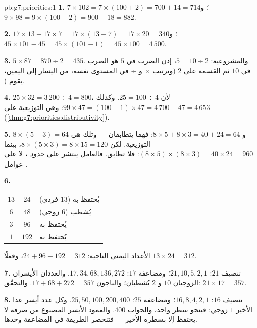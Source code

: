 \begin{solution}{pb:g7:priorities:1}
\textbf{1.} $7 \times 102 = 7 \times (100 + 2) = 700 + 14 =
714$؛ \quad و $9 \times 98 = 9 \times (100 - 2) = 900 - 18 = 882$.

\textbf{2.} $17 \times 13 + 17 \times 7 = 17 \times (13 + 7) =
17 \times 20 = 340$؛ \quad و $45 \times 101 - 45 = 45 \times (101
- 1) = 45 \times 100 = 4\,500$.

\textbf{3.} $5 \times 87 = 870 \div 2 = 435$. والمشروعية:
$5 = 10 \div 2$، إذن الضرب في $5$ هو الضرب في $10$
ثم القسمة على $2$ (وترتيب $\times$ و $\div$ في
المستوى نفسه، من اليسار إلى اليمين، يقوم ).

\textbf{4.} $25 \times 32 = 3\,200 \div 4 = 800$، لأن
$25 = 100 \div 4$. وكذلك
$99 \times 47 = (100 - 1) \times 47 = 4\,700 - 47 = 4\,653$:
وهي التوزيعية على 
(\cref{thm:g7:priorities:distributivity}).

\textbf{5.} $8 \times (5 + 3) = 64$ و $8 \times 5 + 8 \times 3
= 40 + 24 = 64$: فهما يتطابقان --- وتلك هي التوزيعية. لكن
$8 \times (5 \times 3) = 8 \times 15 = 120$، بينما
$(8 \times 5) \times (8 \times 3) = 40 \times 24 = 960$: فلا
تطابق. فالعامل ينتشر على \emph{حدود }، لا
على عوامل .

\textbf{6.}
\begin{center}
\renewcommand{\arraystretch}{1.15}
\begin{tabular}{ccl}
$13$ & $24$ & يُحتفظ به ($13$ فردي) \\
$6$ & $48$ & يُشطب ($6$ زوجي) \\
$3$ & $96$ & يُحتفظ به \\
$1$ & $192$ & يُحتفظ به \\
\end{tabular}
\end{center}
 الأعداد اليمنى الناجية: $24 + 96 + 192 = 312$، وفعلًا
$13 \times 24 = 312$.

\textbf{7.} تنصيف $21$: $21, 10, 5, 2, 1$؛ ومضاعفة $17$:
$17, 34, 68, 136, 272$. والعددان الأيسران الزوجيان $10$ و $2$ يُشطبان؛
والناجون $17 + 68 + 272 = 357$. والتحقّق:
$21 \times 17 = 357$.

\textbf{8.} تنصيف $16$: $16, 8, 4, 2, 1$؛ ومضاعفة $25$:
$25, 50, 100, 200, 400$. وكل عدد أيسر عدا الأخير $1$
زوجي: فينجو سطر واحد، والجواب $400$. والعمود
الأيسر المصنوع من  صرفة لا يحتفظ إلا بسطره الأخير ---
فتنحصر الطريقة في المضاعفة وحدها.


\end{solution}
